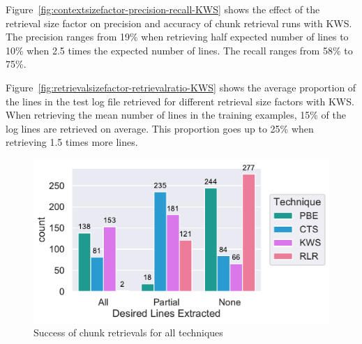 \documentclass[\myrootdir/main.tex]{subfiles}
\begin{document}
Figure~\ref{fig:contextsizefactor-precision-recall-KWS} shows the effect of the retrieval size factor on precision and accuracy of chunk retrieval runs with KWS\@.
The precision ranges from 19\% when retrieving half expected number of lines to 10\% when 2.5 times the expected number of lines.
The recall ranges from 58\% to 75\%.

Figure~\ref{fig:retrievalsizefactor-retrievalratio-KWS} shows the average proportion of the lines in the test log file retrieved for different retrieval size factors with KWS\@.
When retrieving the mean number of lines in the training examples, 15\% of the log lines are retrieved on average.
This proportion goes up to 25\% when retrieving 1.5 times more lines.



\begin{figure}[htbp]
		\centering
		\includegraphics[width=\textwidth, clip]{img/big-study/success-partial-all.pdf}
		\caption{Success of chunk retrievals for all techniques}
		\label{fig:success-partial-all}
\end{figure}
\end{document}
